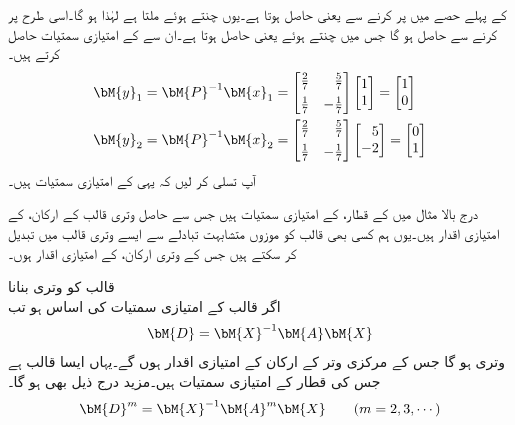  کے پہلے حصے  میں  پر کرنے سے  یعنی  حاصل ہوتا ہے۔یوں  چنتے ہوئے  ملتا ہے لہٰذا  ہو گا۔اسی طرح  پر کرنے سے  حاصل ہو گا جس میں  چنتے ہوئے  یعنی
  حاصل ہوتا ہے۔ان سے  کے امتیازی سمتیات حاصل کرتے ہیں۔
\begin{align*}
\bM{y}_1&=\bM{P}^{-1}\bM{x}_1=\begin{bmatrix*}[r]\tfrac{2}{7}&\tfrac{5}{7}\\[0.5em] \tfrac{1}{7}&-\tfrac{1}{7}  \end{bmatrix*}\begin{bmatrix*}[r]1\\1 \end{bmatrix*}=\begin{bmatrix*}[r]1\\0 \end{bmatrix*}\\
\bM{y}_2&=\bM{P}^{-1}\bM{x}_2=\begin{bmatrix*}[r]\tfrac{2}{7}&\tfrac{5}{7}\\[0.5em] \tfrac{1}{7}&-\tfrac{1}{7}  \end{bmatrix*}\begin{bmatrix*}[r]5\\-2 \end{bmatrix*}=\begin{bmatrix*}[r]0\\1 \end{bmatrix*}
\end{align*}
آپ تسلی کر لیں کہ یہی  کے امتیازی سمتیات ہیں۔

درج بالا  مثال میں  کے قطار،  کے امتیازی سمتیات ہیں جس سے حاصل وتری  قالب  کے ارکان،  کے امتیازی اقدار ہیں۔یوں ہم کسی بھی قالب  کو موزوں متشابہت تبادلے سے ایسے وتری قالب میں تبدیل کر سکتے ہیں جس کے وتری ارکان،  کے امتیازی اقدار ہوں۔  

\quad قالب کو وتری بنانا\\
اگر  قالب  کے امتیازی سمتیات کی اساس ہو تب
\begin{align}\label{مساوات_امتیازی_وتری_حصول_الف}
\bM{D}=\bM{X}^{-1}\bM{A}\bM{X}
\end{align}
وتری ہو گا جس کے مرکزی وتر کے ارکان  کے امتیازی اقدار ہوں گے۔یہاں  ایسا قالب ہے جس کی  قطار  کے  امتیازی سمتیات ہیں۔مزید درج ذیل بھی ہو گا۔
\begin{align}\label{مساوات_امتیازی_وتری_حصول_ب}
\bM{D}^m=\bM{X}^{-1}\bM{A}^m\bM{X}\quad \quad (m=2,3,\cdots)
\end{align}

